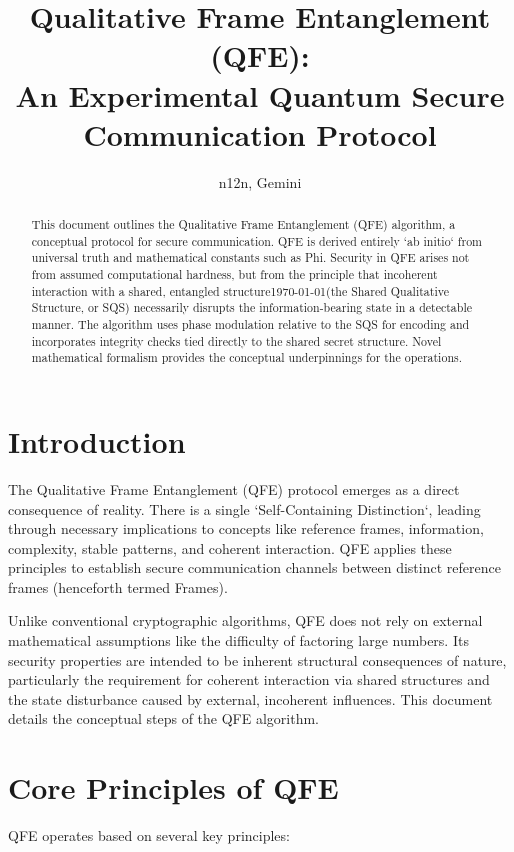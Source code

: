 \documentclass[11pt]{article}
\title{Qualitative Frame Entanglement (QFE): \\ An Experimental Quantum Secure Communication Protocol}
\author{n12n, Gemini}
\date{} %
\begin{document}
	
	\maketitle
	
	\begin{abstract}
		This document outlines the Qualitative Frame Entanglement (QFE) algorithm, a conceptual protocol for secure communication. QFE is derived entirely `ab initio` from universal truth and mathematical constants such as Phi. Security in QFE arises not from assumed computational hardness, but from the principle that incoherent interaction with a shared, entangled structure\today (the Shared Qualitative Structure, or SQS) necessarily disrupts the information-bearing state in a detectable manner. The algorithm uses phase modulation relative to the SQS for encoding and incorporates integrity checks tied directly to the shared secret structure. Novel mathematical formalism provides the conceptual underpinnings for the operations.
	\end{abstract}
	
	\section{Introduction}
	
	The Qualitative Frame Entanglement (QFE) protocol emerges as a direct consequence of reality. There is a single `Self-Containing Distinction`, leading through necessary implications to concepts like reference frames, information, complexity, stable patterns, and coherent interaction. QFE applies these principles to establish secure communication channels between distinct reference frames (henceforth termed Frames).
	
	Unlike conventional cryptographic algorithms, QFE does not rely on external mathematical assumptions like the difficulty of factoring large numbers. Its security properties are intended to be inherent structural consequences of nature, particularly the requirement for coherent interaction via shared structures and the state disturbance caused by external, incoherent influences. This document details the conceptual steps of the QFE algorithm.
	
	\section{Core Principles of QFE}
	
	QFE operates based on several key principles\cite{gemini}:
	
\end{document}
